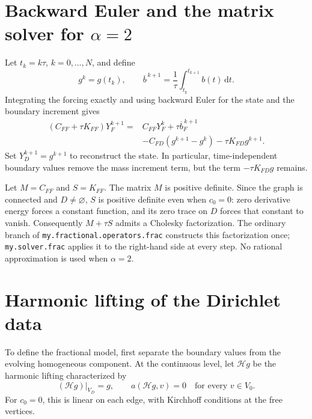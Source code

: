 \documentclass[11pt,a4paper]{article}
\newcommand{\dd}{\,\mathrm d}
\begin{document}
\section{Backward Euler and the matrix solver for \texorpdfstring{$\alpha=2$}{alpha=2}}
Let $t_k=k\tau$, $k=0,\ldots,N$, and define
\[
 g^k=g(t_k),\qquad
 \overline b^{\,k+1}=\frac1\tau\int_{t_k}^{t_{k+1}}b(t)\dd t.
\]
Integrating the forcing exactly and using backward Euler for the state
and the boundary increment gives
\begin{equation}\label{eq:ordinaryBE}
\boxed{\begin{aligned}
 (C_{FF}+\tau K_{FF})Y_F^{k+1}
   ={}&C_{FF}Y_F^k+\tau\overline b_F^{\,k+1}\\
     &-C_{FD}(g^{k+1}-g^k)-\tau K_{FD}g^{k+1}.
\end{aligned}}
\end{equation}
Set $Y_D^{k+1}=g^{k+1}$ to reconstruct the state.
In particular, time-independent boundary values remove the mass
increment term, but the term $-\tau K_{FD}g$ remains.

Let $M=C_{FF}$ and $S=K_{FF}$. The matrix $M$ is positive definite.
Since the graph is connected and $D\ne\varnothing$, $S$ is positive
definite even when $c_0=0$: zero derivative energy forces a constant
function, and its zero trace on $D$ forces that constant to vanish.
Consequently $M+\tau S$ admits a Cholesky factorization. The ordinary
branch of \texttt{my.fractional.operators.frac} constructs this
factorization once; \texttt{my.solver.frac} applies it to the
right-hand side at every step. No rational approximation is used when
$\alpha=2$.

\section{Harmonic lifting of the Dirichlet data}
To define the fractional model, first separate the boundary values from
the evolving homogeneous component. At the continuous level, let
$\mathcal H g$ be the harmonic lifting characterized by
\begin{equation}\label{eq:continuouslift}
 (\mathcal H g)|_{V_D}=g,\qquad
 a(\mathcal H g,v)=0\quad\text{for every }v\in V_0.
\end{equation}
For $c_0=0$, this is linear on each edge, with Kirchhoff conditions at
the free vertices.
\end{document}
